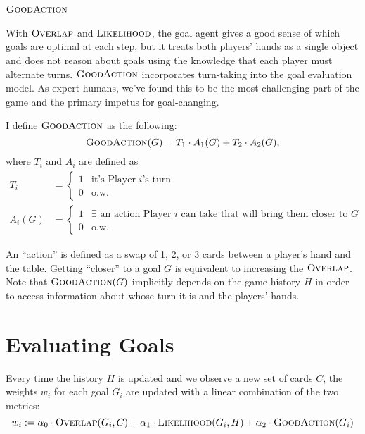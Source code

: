 \documentclass[11pt]{article}
\newcommand{\overlap}{\textsc{Overlap}}
\newcommand{\lkhd}{\textsc{Likelihood}}
\newcommand{\goodaction}{\textsc{GoodAction}}
\begin{document}
\subsection{$\goodaction$}

With $\overlap$ and $\lkhd$, the goal agent gives a good sense of which goals are optimal at each step, but it treats both players' hands as a single object and does not reason about goals using the knowledge that each player must alternate turns. $\goodaction$ incorporates turn-taking into the goal evaluation model. As expert humans, we've found this to be the most challenging part of the game and the primary impetus for goal-changing.

I define $\goodaction$ as the following:
\begin{equation}
  \goodaction(G) = T_1 \cdot A_1(G) + T_2 \cdot A_2(G),
\label{eq:goodaction} \end{equation}
where $T_i$ and $A_i$ are defined as
\begin{align}
  T_i &= \begin{cases}
    1 & \text{it's Player $i$'s turn} \\
    0 & \text{o.w.}
  \end{cases} \\
  A_i(G) &= \begin{cases}
    1 & \exists \text{ an action Player $i$ can take that will bring them closer to $G$} \\
    0 & \text{o.w.}
  \end{cases}
\end{align}

An ``action'' is defined as a swap of 1, 2, or 3 cards between a player's hand and the table. Getting ``closer'' to a goal $G$ is equivalent to increasing the $\overlap$. Note that $\goodaction(G)$ implicitly depends on the game history $H$ in order to access information about whose turn it is and the players' hands.

\section{Evaluating Goals}

Every time the history $H$ is updated and we observe a new set of cards $C$, the weights $w_i$ for each goal $G_i$ are updated with a linear combination of the two metrics:
\begin{equation}
  w_i := \alpha_0 \cdot \overlap(G_i,C) + \alpha_1 \cdot \lkhd(G_i,H) + \alpha_2 \cdot \goodaction(G_i)
\label{eq:w-update} \end{equation}
\end{document}

